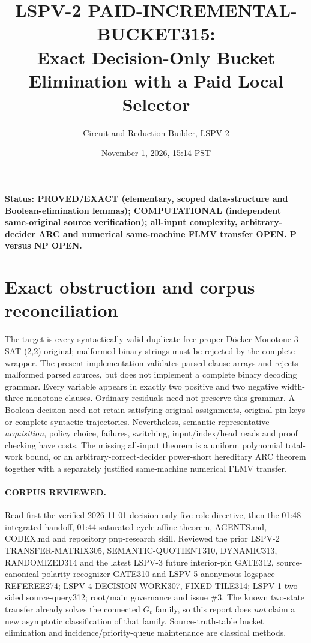 \documentclass[11pt]{article}
\title{LSPV-2 PAID-INCREMENTAL-BUCKET315:\\Exact Decision-Only Bucket Elimination with a Paid Local Selector}
\author{Circuit and Reduction Builder, LSPV-2}
\date{November 1, 2026, 15:14 PST}
\begin{document}
\maketitle
\noindent\textbf{Status: PROVED/EXACT (elementary, scoped data-structure and Boolean-elimination lemmas); COMPUTATIONAL (independent same-original source verification); all-input complexity, arbitrary-decider ARC and numerical same-machine FLMV transfer OPEN. P versus NP OPEN.}

\section{Exact obstruction and corpus reconciliation}
The target is every syntactically valid duplicate-free proper D\"ocker Monotone 3-SAT-(2,2) original; malformed binary strings must be rejected by the complete wrapper. The present implementation validates parsed clause arrays and rejects malformed parsed sources, but does not implement a complete binary decoding grammar. Every variable appears in exactly two positive and two negative width-three monotone clauses. Ordinary residuals need not preserve this grammar. A Boolean decision need not retain satisfying original assignments, original pin keys or complete syntactic trajectories. Nevertheless, semantic representative \emph{acquisition}, policy choice, failures, switching, input/index/head reads and proof checking have costs. The missing all-input theorem is a uniform polynomial total-work bound, or an arbitrary-correct-decider power-short hereditary ARC theorem together with a separately justified same-machine numerical FLMV transfer.

\paragraph{CORPUS REVIEWED.} Read first the verified 2026-11-01 decision-only five-role directive, then the 01:48 integrated handoff, 01:44 saturated-cycle affine theorem, AGENTS.md, CODEX.md and repository pnp-research skill. Reviewed the prior LSPV-2 TRANSFER-MATRIX305, SEMANTIC-QUOTIENT310, DYNAMIC313, RANDOMIZED314 and the latest LSPV-3 future interior-pin GATE312, source-canonical polarity recognizer GATE310 and LSPV-5 anonymous logspace REFEREE274; LSPV-4 DECISION-WORK307, FIXED-TILE314; LSPV-1 two-sided source-query312; root/main governance and issue \#3. The known two-state transfer already solves the connected $G_t$ family, so this report does \emph{not} claim a new asymptotic classification of that family. Source-truth-table bucket elimination and incidence/priority-queue maintenance are classical methods.
\end{document}
